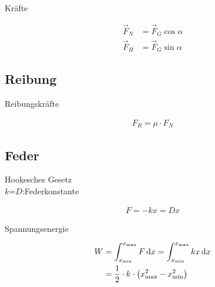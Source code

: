 \begin{boxleft}Kräfte\\
\end{boxleft}\begin{boxrightshaded}
\begin{align}
\vec{F}_N&=\vec{F}_G\cos\alpha\\
\vec{F}_H&=\vec{F}_G\sin\alpha
\end{align}
\end{boxrightshaded}

\subsection{Reibung}

\begin{boxleft}Reibungskräfte
\end{boxleft}\begin{boxrightshaded}
\begin{align}
F_R=\mu\cdot F_N
\end{align}
\end{boxrightshaded}

\subsection{Feder}


\begin{boxleft}Hookesches Gesetz\\
$k$=$D$:Federkonstante
\end{boxleft}\begin{boxrightshaded}
\begin{align}
F=-kx=Dx
\end{align}
\end{boxrightshaded}

\begin{boxleft}Spannungsenergie
\end{boxleft}\begin{boxrightshaded}
\begin{align}
W	&=\int_{x_\text{min}}^{x_\text{max}}F\mathop{}\!\mathrm{d} x=\int_{x_\text{min}}^{x_\text{max}}kx\mathop{}\!\mathrm{d} x\\
	&=\frac{1}{2}\cdot k\cdot \left(x_{\text{max}}^2-x_{\text{min}}^2\right)
\end{align}
\end{boxrightshaded}

